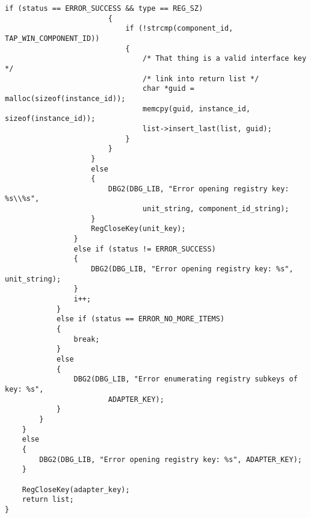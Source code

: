 \begin{lstlisting}[caption=Code für das Suchen eines TAP-Geräts,label=lst:find_tap_devices]
                        if (status == ERROR_SUCCESS && type == REG_SZ)
                        {
                            if (!strcmp(component_id, TAP_WIN_COMPONENT_ID))
                            {
                                /* That thing is a valid interface key */
                                /* link into return list */
                                char *guid = malloc(sizeof(instance_id));
                                memcpy(guid, instance_id, sizeof(instance_id));
                                list->insert_last(list, guid);
                            }
                        }
                    }
                    else
                    {
                        DBG2(DBG_LIB, "Error opening registry key: %s\\%s",
                                unit_string, component_id_string);
                    }
                    RegCloseKey(unit_key);
                }
                else if (status != ERROR_SUCCESS)
                {
                    DBG2(DBG_LIB, "Error opening registry key: %s", unit_string);
                }
                i++;
            }
            else if (status == ERROR_NO_MORE_ITEMS)
            {
                break;
            }
            else
            {
                DBG2(DBG_LIB, "Error enumerating registry subkeys of key: %s",
                        ADAPTER_KEY);
            }
        }
    }
    else
    {
        DBG2(DBG_LIB, "Error opening registry key: %s", ADAPTER_KEY);
    }

    RegCloseKey(adapter_key);
    return list;
}
\end{lstlisting}


